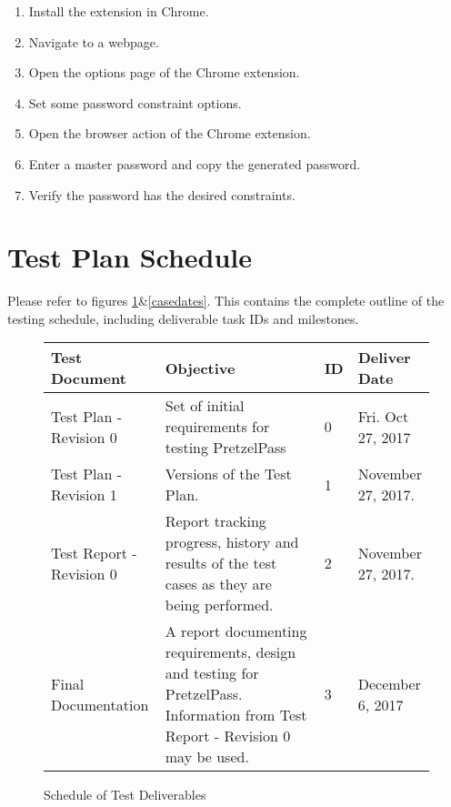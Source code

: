 \documentclass[12pt]{article}
\begin{document}
\begin{enumerate}
\item Install the extension in Chrome. 
\item Navigate to a webpage. 
\item Open the options page of the Chrome extension. 
\item Set some password constraint options. 
\item Open the browser action of the Chrome extension. 
\item Enter a master password and copy the generated password. 
\item Verify the password has the desired constraints. 
\end{enumerate}

\section{Test Plan Schedule}
Please refer to figures \ref{sched}\&\ref{casedates}.  This contains the complete outline of the testing schedule, including deliverable task IDs and milestones.  

\begin{figure}
\caption{Schedule of Test Deliverables}
\label{sched}
\begin{tabular}{| p{0.3\linewidth} | p{0.5\linewidth} | p{0.05\linewidth} | p{0.15\linewidth} |}
	\hline
	\textbf{Test Document} & Objective & ID & Deliver Date \\
	\hline
	\hline
	Test Plan - Revision 0   & Set of initial requirements for testing PretzelPass & 0 & Fri. Oct 27, 2017 \\
	Test Plan - Revision 1   & Versions of the Test Plan. & 1 & November 27, 2017. \\
	Test Report - Revision 0 & Report tracking progress, history and results of the test cases as they are being performed. & 2 & November 27, 2017. \\
	Final Documentation & A report documenting requirements, design and testing for 
						PretzelPass.  Information from Test Report - Revision 0 may be used.
						& 3 & December 6, 2017 \\
	\hline
\end{tabular}
\end{figure}
\clearpage
\newpage
\end{document}
